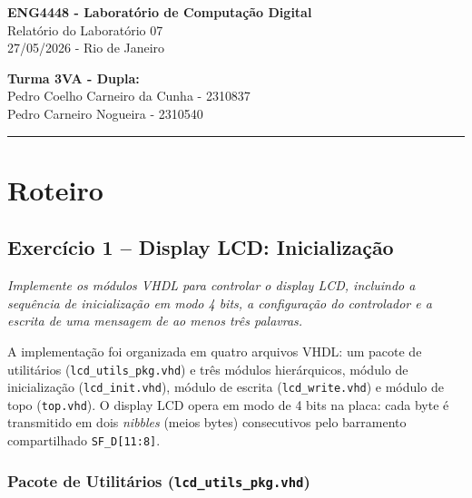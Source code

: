 \documentclass[12pt,a4paper]{article}
\newcommand{\question}[1]{
    \vspace{0.8em}
    \noindent\textit{#1}
    \vspace{0.4em}
}
\newcommand{\answer}{
    \par
}
\begin{document}
\begin{center}
    {\LARGE \textbf{ENG4448 - Laboratório de Computação Digital}}\\[0.3cm]
    {\Large Relatório do Laboratório 07}\\[0.2cm]
    27/05/2026 - Rio de Janeiro
\end{center}

\vspace{0.8cm}

\noindent \textbf{Turma 3VA - Dupla:}\\
Pedro Coelho Carneiro da Cunha - 2310837\\
Pedro Carneiro Nogueira - 2310540

\vspace{0.5cm}
\hrule
\vspace{0.8cm}

\setcounter{section}{1}
\setcounter{subsection}{0}

\section{Roteiro}

\subsection{Exercício 1 – Display LCD: Inicialização}

\question{Implemente os módulos VHDL para controlar o display LCD, incluindo a sequência
de inicialização em modo 4 bits, a configuração do controlador e a escrita de uma mensagem
de ao menos três palavras.}

\answer
A implementação foi organizada em quatro arquivos VHDL: um pacote de utilitários
(\texttt{lcd\_utils\_pkg.vhd}) e três módulos hierárquicos, módulo de inicialização
(\texttt{lcd\_init.vhd}), módulo de escrita (\texttt{lcd\_write.vhd}) e módulo de topo
(\texttt{top.vhd}). O display LCD opera em modo de 4 bits na placa: cada byte é transmitido em dois \textit{nibbles} (meios bytes)
consecutivos pelo barramento compartilhado \texttt{SF\_D[11:8]}.

\subsubsection{Pacote de Utilitários (\texttt{lcd\_utils\_pkg.vhd})}
\end{document}
